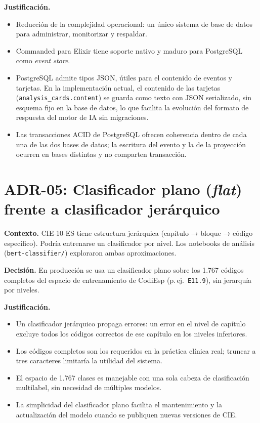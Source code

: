 \textbf{Justificación.}
\begin{itemize}
    \item Reducción de la complejidad operacional: un único sistema de base de datos para administrar, monitorizar y respaldar.
    \item Commanded para Elixir tiene soporte nativo y maduro para PostgreSQL como \emph{event store}.
    \item PostgreSQL admite tipos JSON, útiles para el contenido de eventos y tarjetas. En la implementación actual, el contenido de las tarjetas (\texttt{analysis\_cards.content}) se guarda como texto con JSON serializado, sin esquema fijo en la base de datos, lo que facilita la evolución del formato de respuesta del motor de IA sin migraciones.
    \item Las transacciones ACID de PostgreSQL ofrecen coherencia dentro de cada una de las dos bases de datos; la escritura del evento y la de la proyección ocurren en bases distintas y no comparten transacción.
\end{itemize}

\section{ADR-05: Clasificador plano (\emph{flat}) frente a clasificador jerárquico}

\textbf{Contexto.} CIE-10-ES tiene estructura jerárquica (capítulo → bloque → código específico). Podría entrenarse un clasificador por nivel. Los notebooks de análisis (\texttt{bert-classifier/}) exploraron ambas aproximaciones.

\textbf{Decisión.} En producción se usa un clasificador plano sobre los 1.767 códigos completos del espacio de entrenamiento de CodiEsp (p.\,ej.\ \texttt{E11.9}), sin jerarquía por niveles.

\textbf{Justificación.}
\begin{itemize}
    \item Un clasificador jerárquico propaga errores: un error en el nivel de capítulo excluye todos los códigos correctos de ese capítulo en los niveles inferiores.
    \item Los códigos completos son los requeridos en la práctica clínica real; truncar a tres caracteres limitaría la utilidad del sistema.
    \item El espacio de 1.767 clases es manejable con una sola cabeza de clasificación multilabel, sin necesidad de múltiples modelos.
    \item La simplicidad del clasificador plano facilita el mantenimiento y la actualización del modelo cuando se publiquen nuevas versiones de CIE.
\end{itemize}

